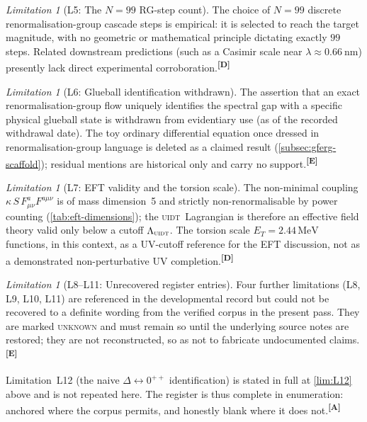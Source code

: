 \documentclass[12pt,a4paper,twoside]{article}
\theoremstyle{plain}
\theoremstyle{definition}
\theoremstyle{remark}
\newtheorem{limitation}[theorem]{Limitation}
\newcommand{\UIDT}{\textsc{uidt}}
\newcommand{\MeV}{\,\mathrm{MeV}}
\newcommand{\catmark}[1]{\textsuperscript{\textsf{\textbf{[#1]}}}}
\newcommand{\ETorsion}{2.44\MeV} %
\begin{document}
\begin{limitation}[L5: The $N=99$ RG-step count]
\label{lim:L5}
The choice of $N=99$ discrete renormalisation-group cascade steps is empirical: it is selected to reach the target magnitude, with no geometric or mathematical principle dictating exactly $99$ steps. Related downstream predictions (such as a Casimir scale near $\lambda \approx 0.66\ \mathrm{nm}$) presently lack direct experimental corroboration.\catmark{D}
\end{limitation}

\begin{limitation}[L6: Glueball identification withdrawn]
\label{lim:L6}
The assertion that an exact renormalisation-group flow uniquely identifies the spectral gap with a specific physical glueball state is withdrawn from evidentiary use (as of the recorded withdrawal date). The toy ordinary differential equation once dressed in renormalisation-group language is deleted as a claimed result (\cref{subsec:gferg-scaffold}); residual mentions are historical only and carry no support.\catmark{E}
\end{limitation}

\begin{limitation}[L7: EFT validity and the torsion scale]
\label{lim:L7}
The non-minimal coupling $\kappa\,S\,F_{\mu\nu}^a F^{a\mu\nu}$ is of mass dimension~5 and strictly non-renormalisable by power counting (\cref{tab:eft-dimensions}); the \UIDT\ Lagrangian is therefore an effective field theory valid only below a cutoff $\Lambda_{\UIDT}$. The torsion scale $E_T = \ETorsion$ functions, in this context, as a UV-cutoff reference for the EFT discussion, not as a demonstrated non-perturbative UV completion.\catmark{D}
\end{limitation}

\begin{limitation}[L8--L11: Unrecovered register entries]
\label{lim:L8toL11}
Four further limitations (L8, L9, L10, L11) are referenced in the developmental record but could not be recovered to a definite wording from the verified corpus in the present pass. They are marked \textsc{unknown} and must remain so until the underlying source notes are restored; they are not reconstructed, so as not to fabricate undocumented claims.\catmark{E}
\end{limitation}

\noindent Limitation~L12 (the naive $\Delta\!\leftrightarrow\!0^{++}$ identification) is stated in full at \cref{lim:L12} above and is not repeated here. The register is thus complete in enumeration: anchored where the corpus permits, and honestly blank where it does not.\catmark{A}
\end{document}
